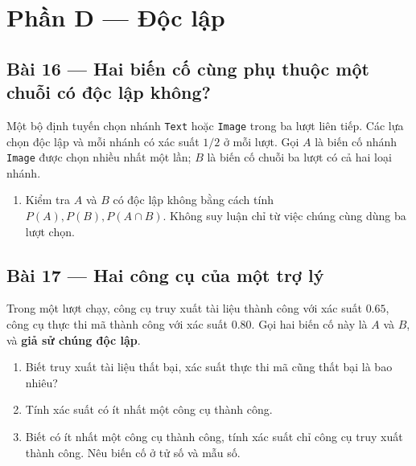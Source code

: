\documentclass[11pt,a4paper]{article}
\newcommand{\partheading}[2]{\section*{Phần #1 --- #2}\addcontentsline{toc}{section}{Phần #1 --- #2}}
\begin{document}
\noindent\begin{minipage}{\linewidth}

\partheading{D}{Độc lập}
\subsection*{Bài 16 --- Hai biến cố cùng phụ thuộc một chuỗi có độc lập không?}

Một bộ định tuyến chọn nhánh \texttt{Text} hoặc \texttt{Image} trong ba lượt liên tiếp. Các lựa chọn độc lập và mỗi nhánh có xác suất \(1/2\) ở mỗi lượt. Gọi \(A\) là biến cố nhánh \texttt{Image} được chọn nhiều nhất một lần; \(B\) là biến cố chuỗi ba lượt có cả hai loại nhánh.

\begin{enumerate}[label=\alph*)]
\item Kiểm tra \(A\) và \(B\) có độc lập không bằng cách tính \(P(A),P(B),P(A\cap B)\). Không suy luận chỉ từ việc chúng cùng dùng ba lượt chọn.
\end{enumerate}

\end{minipage}\par

\par\medskip

\noindent\begin{minipage}{\linewidth}
\subsection*{Bài 17 --- Hai công cụ của một trợ lý}

Trong một lượt chạy, công cụ truy xuất tài liệu thành công với xác suất \(0.65\), công cụ thực thi mã thành công với xác suất \(0.80\). Gọi hai biến cố này là \(A\) và \(B\), và \textbf{giả sử chúng độc lập}.

\begin{enumerate}[label=\alph*)]
\item Biết truy xuất tài liệu thất bại, xác suất thực thi mã cũng thất bại là bao nhiêu?
\item Tính xác suất có ít nhất một công cụ thành công.
\item Biết có ít nhất một công cụ thành công, tính xác suất chỉ công cụ truy xuất thành công. Nêu biến cố ở tử số và mẫu số.
\end{enumerate}

\end{minipage}\par
\end{document}
